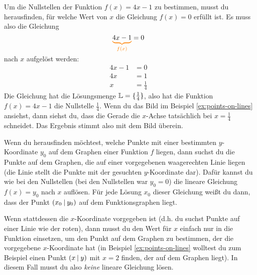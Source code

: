 \documentclass[../../main.tex]{subfiles}
\begin{document}
\begin{example}{}
    Um die Nullstellen der Funktion $f(x)=4x-1$ zu bestimmen, musst du herausfinden, für welche Wert von $x$ die Gleichung $f(x)=0$ erfüllt ist. Es muss also die Gleichung
    \[\colorbrace{4x-1}{f(x)}=0\]
    nach $x$ aufgelöst werden:
    \begin{align*}
        4x-1&=0\\
        4x&=1\\
        x&=\frac{1}{4}
    \end{align*}
    Die Gleichung hat die Lösungsmenge $\mathbb{L}=\{\frac{1}{4}\}$, also hat die Funktion \mbox{$f(x)=4x-1$} die Nullstelle $\frac{1}{4}$. Wenn du das Bild im Beispiel \ref{ex:points-on-lines} ansiehst, dann siehst du, dass die Gerade die $x$-Achse tatsächlich bei $x=\frac{1}{4}$ schneidet. Das Ergebnis stimmt also mit dem Bild überein.
\end{example}

Wenn du herausfinden möchtest, welche Punkte mit einer bestimmten $y$-Koordinate $y_0$ auf dem Graphen einer Funktion $f$ liegen, dann suchst du die Punkte auf dem Graphen, die auf einer vorgegebenen waagerechten Linie liegen (die Linie stellt die Punkte mit der gesuchten $y$-Koordinate dar). Dafür kannst du wie bei den Nullstellen (bei den Nullstellen war $y_0=0$) die lineare Gleichung $f(x)=y_0$ nach $x$ auflösen. Für jede Lösung $x_0$ dieser Gleichung weißt du dann, dass der Punkt $\left(x_0 \:\middle|\: y_0\right)$ auf dem Funktionsgraphen liegt.

Wenn stattdessen die $x$-Koordinate vorgegeben ist (d.h. du suchst Punkte auf einer Linie wie der roten), dann musst du den Wert für $x$ einfach nur in die Funktion einsetzen, um den Punkt auf dem Graphen zu bestimmen, der die vorgegebene $x$-Koordinate hat (in Beispiel \ref{ex:points-on-lines} wolltest du zum Beispiel einen Punkt $\left(x \:\middle|\: y\right)$ mit $x=2$ finden, der auf dem Graphen liegt). In diesem Fall musst du also \emph{keine} lineare Gleichung lösen.
\end{document}

